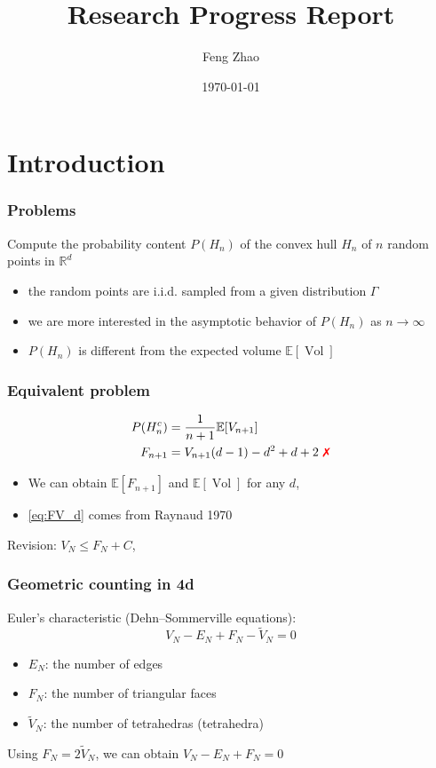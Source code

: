 \documentclass{beamer}
\title{Research Progress Report}
\author{Feng Zhao}
\date{\today}
\DeclareMathOperator{\Vol}{Vol}
\begin{document}
\begin{frame}
	\titlepage
\end{frame}


\section{Introduction}

\begin{frame}
\frametitle{Problems}
Compute the probability content $P(H_n)$ of the convex hull $H_n$
of $n$ random points in $\mathbb{R}^d$
\begin{itemize}
\item the random points are i.i.d. sampled from a given distribution $\Gamma$
\item we are more interested in the asymptotic behavior of $P(H_n)$
as $n\to\infty$
\item $P(H_n)$ is different from the expected volume $\mathbb{E}[\Vol]$
\end{itemize}
\end{frame}
\begin{frame}
	\frametitle{Equivalent problem}
    \begin{align}
        P(H_n^c) & = \frac{1}{n+1}\mathbb{E}[V_{n+1}]\\
        F_{n+1} & = V_{n+1} (d-1) - d^2 + d + 2 \textrm{ \textcolor{red}{\ding{55}}}
        \label{eq:FV_d}
    \end{align}   
    \begin{itemize}
    \item We can obtain
    $\mathbb{E}[F_{n+1}]$ and $\mathbb{E}[\Vol]$ for any $d$, 
    \item \eqref{eq:FV_d} comes from Raynaud 1970
    \end{itemize}
    Revision: $V_N \leq F_N + C$,
    
\end{frame}   


\begin{frame}
    \frametitle{Geometric counting in 4d}
    Euler's characteristic (Dehn–Sommerville equations):
    \begin{equation}
        V_N - E_N + F_N - \widetilde{V}_N = 0
    \end{equation}   
    \begin{itemize}
        \item $E_N$: the number of edges
        \item $F_N$: the number of triangular faces
        \item $\widetilde{V}_N$: the number of tetrahedras (tetrahedra)
    \end{itemize}    
    Using $F_N = 2 \widetilde{V}_N$,
    we can obtain $V_N - E_N + F_N = 0$
\end{frame}
\end{document}

